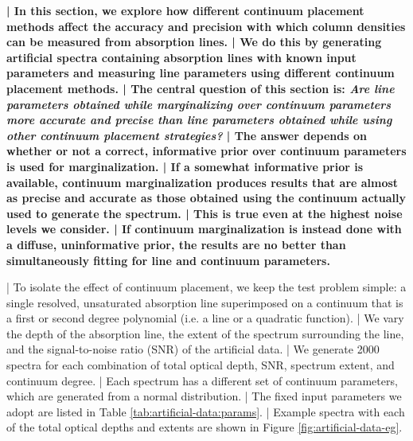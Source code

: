 \documentclass[trackchanges]{aastex62}
\begin{document}
{\color{red} \bf
| In this section, we explore how different continuum placement methods affect the accuracy and precision with which column densities can be measured from absorption lines.
| We do this by generating artificial spectra containing absorption lines with known input parameters and measuring line parameters using different continuum placement methods.
| The central question of this section is: \emph{Are line parameters obtained while marginalizing over continuum parameters more accurate and precise than line parameters obtained while using other continuum placement strategies?}
| The answer depends on whether or not a correct, informative prior over continuum parameters is used for marginalization.
| If a somewhat informative prior is available, continuum marginalization produces results that are almost as precise and accurate as those obtained using the continuum actually used to generate the spectrum.
| This is true even at the highest noise levels we consider.
| If continuum marginalization is instead done with a diffuse, uninformative prior, the results are no better than simultaneously fitting for line and continuum parameters.

| To isolate the effect of continuum placement, we keep the test problem simple: a single resolved, unsaturated absorption line superimposed on a continuum that is a first or second degree polynomial (i.e. a line or a quadratic function).
| We vary the depth of the absorption line, the extent of the spectrum surrounding the line, and the signal-to-noise ratio (SNR) of the artificial data.
| We generate 2000 spectra for each combination of total optical depth, SNR, spectrum extent, and continuum degree.
| Each spectrum has a different set of continuum parameters, which are generated from a normal distribution.
| The fixed input parameters we adopt are listed in Table \ref{tab:artificial-data:params}.
| Example spectra with each of the total optical depths and extents are shown in Figure \ref{fig:artificial-data-eg}.
}
\end{document}
